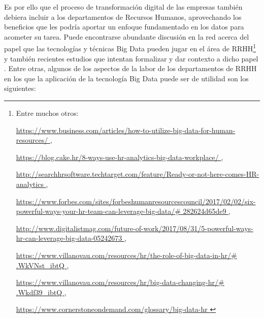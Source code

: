 Es por ello que el proceso de transformación digital de las empresas también
debiera incluir a los departamentos de Recursos Humanos, aprovechando los beneficios 
que les podría aportar un enfoque fundamentado en los datos para acometer su tarea.
Puede encontrarse abundante discusión en la red acerca del papel que las tecnologías y
técnicas Big Data pueden jugar en el área de RRHH\footnote{Entre muchos otros:

\noindent\url{https://www.business.com/articles/how-to-utilize-big-data-for-human-resources/ }, 

\noindent\url{https://blog.cake.hr/8-ways-use-hr-analytics-big-data-workplace/ }, 

\noindent\url{http://searchhrsoftware.techtarget.com/feature/Ready-or-not-here-comes-HR-analytics }, 

\noindent\url{https://www.forbes.com/sites/forbeshumanresourcescouncil/2017/02/02/six-powerful-ways-your-hr-team-can-leverage-big-data/\# 282624d65de9 }, 

\noindent\url{http://www.digitalistmag.com/future-of-work/2017/08/31/5-powerful-ways-hr-can-leverage-big-data-05242673 }, 

\noindent\url{https://www.villanovau.com/resources/hr/the-role-of-big-data-in-hr/\# .WkVNst_ibtQ }, 

\noindent\url{https://www.villanovau.com/resources/hr/big-data-changing-hr/\# .Wkdf39_ibtQ }, 

\noindent\url{https://www.cornerstoneondemand.com/glossary/big-data-hr }
} y también recientes estudios que intentan formalizar y dar contexto a dicho papel \cite{libro_rrhh}.
Entre otras, algunos de los aspectos de la labor de los departamentos de RRHH en los que
la aplicación de la tecnología Big Data puede ser de utilidad son los siguientes:
